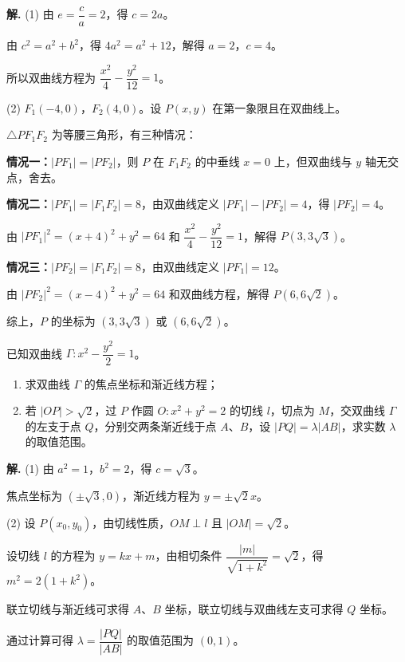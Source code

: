 \documentclass[11pt]{ctexrep}
\begin{document}
\textbf{解.} (1) 由 $e = \dfrac{c}{a} = 2$，得 $c = 2a$。

由 $c^2 = a^2 + b^2$，得 $4a^2 = a^2 + 12$，解得 $a = 2$，$c = 4$。

所以双曲线方程为 $\dfrac{x^2}{4} - \dfrac{y^2}{12} = 1$。

(2) $F_1(-4, 0)$，$F_2(4, 0)$。设 $P(x, y)$ 在第一象限且在双曲线上。

$\triangle PF_1F_2$ 为等腰三角形，有三种情况：

\textbf{情况一：}$|PF_1| = |PF_2|$，则 $P$ 在 $F_1F_2$ 的中垂线 $x = 0$ 上，但双曲线与 $y$ 轴无交点，舍去。

\textbf{情况二：}$|PF_1| = |F_1F_2| = 8$，由双曲线定义 $|PF_1| - |PF_2| = 4$，得 $|PF_2| = 4$。

由 $|PF_1|^2 = (x+4)^2 + y^2 = 64$ 和 $\dfrac{x^2}{4} - \dfrac{y^2}{12} = 1$，解得 $P(3, 3\sqrt{3})$。

\textbf{情况三：}$|PF_2| = |F_1F_2| = 8$，由双曲线定义 $|PF_1| = 12$。

由 $|PF_2|^2 = (x-4)^2 + y^2 = 64$ 和双曲线方程，解得 $P(6, 6\sqrt{2})$。

综上，$P$ 的坐标为 $(3, 3\sqrt{3})$ 或 $(6, 6\sqrt{2})$。

\begin{example}[双曲线与直线综合]
    已知双曲线 $\Gamma: x^2 - \dfrac{y^2}{2} = 1$。
    \begin{enumerate}
        \item 求双曲线 $\Gamma$ 的焦点坐标和渐近线方程；
        \item 若 $|OP| > \sqrt{2}$，过 $P$ 作圆 $O: x^2 + y^2 = 2$ 的切线 $l$，切点为 $M$，交双曲线 $\Gamma$ 的左支于点 $Q$，分别交两条渐近线于点 $A$、$B$，设 $|PQ| = \lambda|AB|$，求实数 $\lambda$ 的取值范围。
    \end{enumerate}
\end{example}

\textbf{解.} (1) 由 $a^2 = 1$，$b^2 = 2$，得 $c = \sqrt{3}$。

焦点坐标为 $(\pm \sqrt{3}, 0)$，渐近线方程为 $y = \pm \sqrt{2}x$。

(2) 设 $P(x_0, y_0)$，由切线性质，$OM \perp l$ 且 $|OM| = \sqrt{2}$。

设切线 $l$ 的方程为 $y = kx + m$，由相切条件 $\dfrac{|m|}{\sqrt{1+k^2}} = \sqrt{2}$，得 $m^2 = 2(1+k^2)$。

联立切线与渐近线可求得 $A$、$B$ 坐标，联立切线与双曲线左支可求得 $Q$ 坐标。

通过计算可得 $\lambda = \dfrac{|PQ|}{|AB|}$ 的取值范围为 $(0, 1)$。
\end{document}

